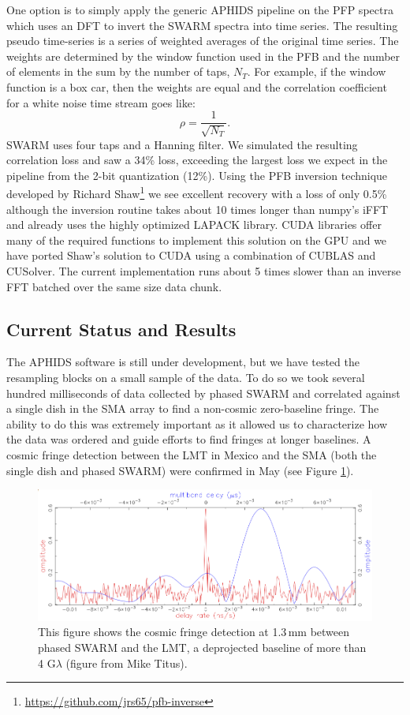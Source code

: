 One option is to simply apply the generic APHIDS pipeline on the PFP spectra which uses an DFT to invert the 
SWARM spectra into time series.  The resulting pseudo time-series is a series of weighted 
averages of the original time series.  The weights are determined by the window function used in the 
PFB and the number of elements in the sum by the number of taps, $N_T$.  For example, if the window function is 
a box car, then the weights are equal and the correlation coefficient for a white noise time stream goes like:
\begin{equation}
\rho = \frac{1}{\sqrt{N_T}}.
\end{equation}
SWARM uses four taps and a Hanning filter.  We simulated the resulting correlation loss and saw a 34\% loss, 
exceeding the largest loss we expect in the pipeline from the 2-bit quantization (12\%).  Using the PFB inversion
technique developed by Richard Shaw\footnote{\url{https://github.com/jrs65/pfb-inverse}} we see excellent 
recovery with a loss of only 0.5\% although the inversion routine takes about 10 times longer than numpy's
iFFT and already uses the highly optimized LAPACK library.  CUDA libraries offer many of the required functions 
to implement this solution on the GPU and we have ported Shaw's solution to CUDA using a combination of 
CUBLAS and CUSolver.  The current implementation runs about 5 times slower than an inverse FFT batched over 
the same size data chunk.

\subsection{Current Status and Results}

The APHIDS software is still under development, but we have tested the resampling blocks on a small sample of
the data.  To do so we took several hundred milliseconds of data collected by phased SWARM and correlated against
a single dish in the SMA array to find a non-cosmic zero-baseline fringe.  The ability to do this was extremely 
important as it allowed us to characterize how the data was ordered and guide efforts to find fringes at longer 
baselines.  A cosmic fringe detection between the LMT in Mexico and the SMA (both the single dish and phased 
SWARM) were confirmed in May (see Figure \ref{fig:sma_lmt}).

\begin{figure}[t!]
\includegraphics[bb=0 0 100 100]{aphids/SMA-LMT.png}
\caption{This figure shows the cosmic fringe detection at 1.3\,mm between phased SWARM and the LMT, a deprojected 
baseline of more than 4 G$\lambda$ (figure from Mike Titus).}
\label{fig:sma_lmt}
\end{figure}

